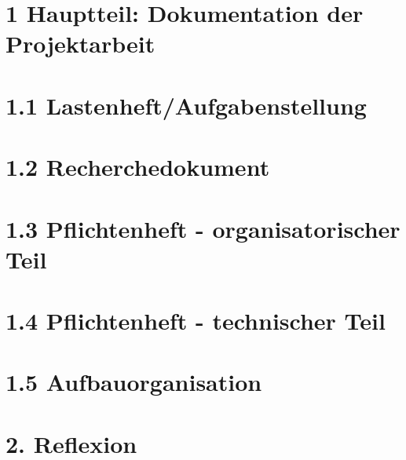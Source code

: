\section*{1 Hauptteil: Dokumentation der Projektarbeit}
\newpage
\section*{1.1 Lastenheft/Aufgabenstellung}
\newpage
\section*{1.2 Recherchedokument}
\newpage
\section*{1.3 Pflichtenheft - organisatorischer Teil}
\newpage
\section*{1.4 Pflichtenheft - technischer Teil}
\newpage
\section*{1.5 Aufbauorganisation}
\newpage
\section*{2. Reflexion}